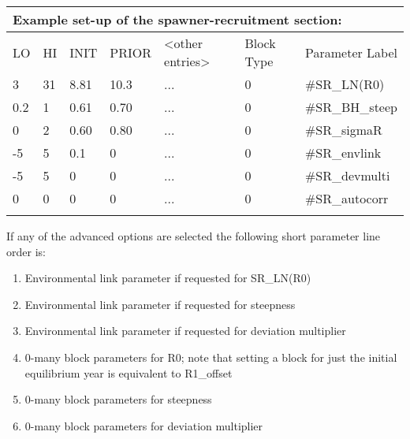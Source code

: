 \begin{center}
	\begin{longtable}{p{1cm} p{1cm} p{1cm}  p{1.5cm}  p{3cm}  p{2.5cm}  p{3cm}  }
		
		\multicolumn{7}{l}{Example set-up of the spawner-recruitment section:}\\
		\hline
		LO & HI & INIT & PRIOR &  <other entries> & Block Type & Parameter Label \\
		\hline
		3    & 31 & 8.81 & 10.3 & ... & 0 & \#SR\_LN(R0) \\
		0.2  & 1  & 0.61 & 0.70 & ... & 0 & \#SR\_BH\_steep \\
		0    & 2  & 0.60 & 0.80 & ... & 0 & \#SR\_sigmaR \\
		-5   & 5  & 0.1  & 0    & ... & 0 & \#SR\_envlink \\
		-5   & 5  & 0    & 0    & ... & 0 & \#SR\_devmulti\\
		0    & 0  & 0    & 0    & ... & 0 & \#SR\_autocorr  \\
		\hline
		\\
	\end{longtable}
\end{center}

\noindent If any of the advanced options are selected the following short parameter line order is:
\begin{enumerate}
	\item Environmental link parameter if requested for SR\_LN(R0)
	\item Environmental link parameter if requested for steepness
	\item Environmental link parameter if requested for deviation multiplier
	\item 0-many block parameters for R0; note that setting a block for just the initial equilibrium year is equivalent to R1\_offset
	\item 0-many block parameters for steepness
	\item 0-many block parameters for deviation multiplier
\end{enumerate}

